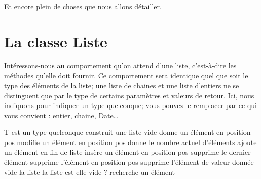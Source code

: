 	Et encore plein de choses que nous allons détailler.
	
	\section{La classe Liste}
	
		Intéressons-nous au comportement qu’on attend d'une liste,
		c'est-à-dire les méthodes qu’elle doit fournir.
		Ce comportement sera identique quel que soit le type des éléments
		de la liste; une liste de chaines et une liste d'entiers
		ne se distinguent que par le type de certains paramètres
		et valeurs de retour.
		Ici, nous indiquons  pour indiquer un type quelconque;
		vous pouvez le remplacer par ce qui vous convient : 
		entier, chaine, Date\dots
		
		\begin{LDA}
				\RComment T est un type quelconque
				\Public
						\RComment construit une liste vide
						\RComment donne un élément en position pos
						\RComment modifie un élément en position pos
						\RComment donne le nombre actuel d’éléments
						\RComment ajoute un élément en fin de liste
						\RComment insère un élément en position pos
						\RComment supprime le dernier élément
						\RComment supprime l'élément en position pos
						\RComment supprime l'élément de valeur donnée
						\RComment vide la liste
						\RComment la liste est-elle vide ?
						\RComment recherche un élément
				\EndClass
		\end{LDA}
		
		\bigskip
		
